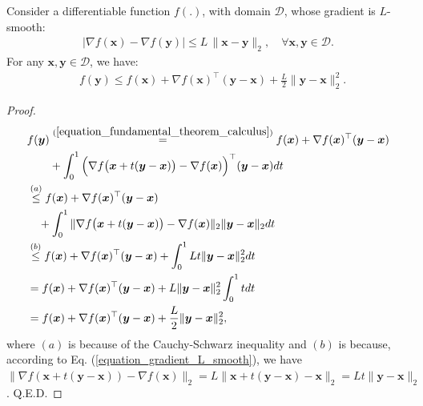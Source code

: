 \documentclass[lang=cn,10pt]{gorgeousnbook}
\numberwithin{equation}{section}%
\numberwithin{figure}{section}%
\begin{document}
\begin{lemma}\label{lemma_fundamental_theorem_calculus_corollary}
Consider a differentiable function $f(.)$, with domain $\mathcal{D}$, whose gradient is $L$-smooth:
\begin{align}\label{equation_gradient_L_smooth}
|\nabla f(\boldsymbol{x}) - \nabla f(\boldsymbol{y})| \leq L\, \|\boldsymbol{x} - \boldsymbol{y}\|_2, \quad \forall \boldsymbol{x}, \boldsymbol{y} \in \mathcal{D}.
\end{align}
For any $\boldsymbol{x}, \boldsymbol{y} \in \mathcal{D}$, we have:
\begin{equation}\label{equation_fundamental_theorem_calculus_Lipschitz}
\begin{aligned}
&f(\boldsymbol{y}) \leq f(\boldsymbol{x}) + \nabla f(\boldsymbol{x})^\top (\boldsymbol{y} - \boldsymbol{x}) + \frac{L}{2} \|\boldsymbol{y} - \boldsymbol{x}\|_2^2.
\end{aligned}
\end{equation}
\end{lemma}
\begin{proof}
\begin{align*}
&f(\boldsymbol{y}) \overset{(\ref{equation_fundamental_theorem_calculus})}{=} f(\boldsymbol{x}) + \nabla f(\boldsymbol{x})^\top (\boldsymbol{y} - \boldsymbol{x}) \\
&~~~~~~+ \int_0^1 \Big(\nabla f\big(\boldsymbol{x} + t(\boldsymbol{y} - \boldsymbol{x})\big) - \nabla f(\boldsymbol{x}) \Big)^\top (\boldsymbol{y} - \boldsymbol{x}) dt \\
&\overset{(a)}{\leq} f(\boldsymbol{x}) + \nabla f(\boldsymbol{x})^\top (\boldsymbol{y} - \boldsymbol{x}) \\
&~~~+ \int_0^1 \|\nabla f\big(\boldsymbol{x} + t(\boldsymbol{y} - \boldsymbol{x})\big) - \nabla f(\boldsymbol{x}) \|_2 \|\boldsymbol{y} - \boldsymbol{x}\|_2 dt \\
&\overset{(b)}{\leq} f(\boldsymbol{x}) + \nabla f(\boldsymbol{x})^\top (\boldsymbol{y} - \boldsymbol{x}) + \int_0^1 L t \|\boldsymbol{y} - \boldsymbol{x}\|_2^2 dt \\
&= f(\boldsymbol{x}) + \nabla f(\boldsymbol{x})^\top (\boldsymbol{y} - \boldsymbol{x}) + L \|\boldsymbol{y} - \boldsymbol{x}\|_2^2 \int_0^1 t dt \\
&= f(\boldsymbol{x}) + \nabla f(\boldsymbol{x})^\top (\boldsymbol{y} - \boldsymbol{x}) + \frac{L}{2} \|\boldsymbol{y} - \boldsymbol{x}\|_2^2,
\end{align*}
where $(a)$ is because of the Cauchy-Schwarz inequality and $(b)$ is because, according to Eq. (\ref{equation_gradient_L_smooth}), we have $\|\nabla f(\boldsymbol{x} + t(\boldsymbol{y} - \boldsymbol{x})) - \nabla f(\boldsymbol{x}) \|_2 = L \|\boldsymbol{x} + t(\boldsymbol{y} - \boldsymbol{x}) - \boldsymbol{x}\|_2 = L t \|\boldsymbol{y} - \boldsymbol{x}\|_2$. Q.E.D.
\end{proof}
\end{document}
